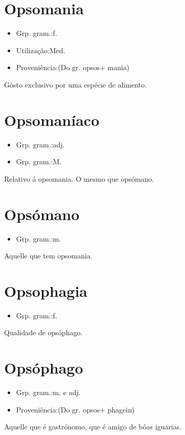 \section{Opsomania}
\begin{itemize}
\item {Grp. gram.:f.}
\end{itemize}
\begin{itemize}
\item {Utilização:Med.}
\end{itemize}
\begin{itemize}
\item {Proveniência:(Do gr. \textunderscore opsos\textunderscore  + \textunderscore mania\textunderscore )}
\end{itemize}
Gôsto exclusivo por uma espécie de alimento.
\section{Opsomaníaco}
\begin{itemize}
\item {Grp. gram.:adj.}
\end{itemize}
\begin{itemize}
\item {Grp. gram.:M.}
\end{itemize}
Relativo á opsomania.
O mesmo que \textunderscore opsómano\textunderscore .
\section{Opsómano}
\begin{itemize}
\item {Grp. gram.:m.}
\end{itemize}
Aquelle que tem opsomania.
\section{Opsophagia}
\begin{itemize}
\item {Grp. gram.:f.}
\end{itemize}
Qualidade de opsóphago.
\section{Opsóphago}
\begin{itemize}
\item {Grp. gram.:m.  e  adj.}
\end{itemize}
\begin{itemize}
\item {Proveniência:(Do gr. \textunderscore opsos\textunderscore  + \textunderscore phagein\textunderscore )}
\end{itemize}
Aquelle que é gastrónomo, que é amigo de bôas iguarias.
